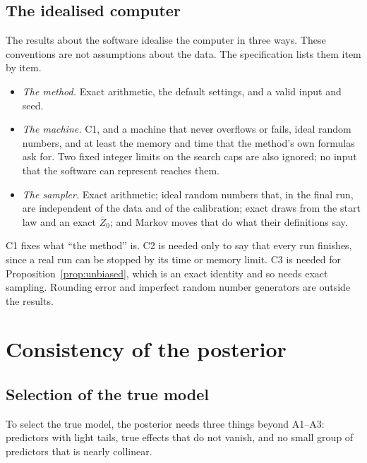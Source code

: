\documentclass[11pt]{article}
\theoremstyle{plain}
\theoremstyle{definition}
\begin{document}
\subsection{The idealised computer}\label{sec:conventions}

The results about the software idealise the computer in three ways. These conventions are not assumptions about the
data. The specification lists them item by item.
\begin{itemize}
  \item[\textbf{C1}] \emph{The method.} Exact arithmetic, the default settings, and a valid input and seed.
  \item[\textbf{C2}] \emph{The machine.} C1, and a machine that never overflows or fails, ideal random numbers, and at
    least the memory and time that the method's own formulas ask for. Two fixed integer limits on the search caps are
    also ignored; no input that the software can represent reaches them.
  \item[\textbf{C3}] \emph{The sampler.} Exact arithmetic; ideal random numbers that, in the final run, are independent
    of the data and of the calibration; exact draws from the start law and an exact $\bar Z_0$; and Markov moves that do
    what their definitions say.
\end{itemize}
C1 fixes what ``the method'' is. C2 is needed only to say that every run finishes, since a real run can be stopped by
its time or memory limit. C3 is needed for Proposition~\ref{prop:unbiased}, which is an exact identity and so needs
exact sampling. Rounding error and imperfect random number generators are outside the results.

\section{Consistency of the posterior}\label{sec:exact}

\subsection{Selection of the true model}\label{sec:selection}

To select the true model, the posterior needs three things beyond A1--A3: predictors with light tails, true effects
that do not vanish, and no small group of predictors that is nearly collinear.
\end{document}
